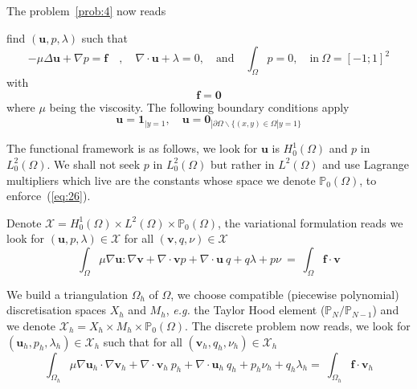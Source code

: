 The problem~\ref{prob:4} now reads
\begin{problem}
  \label{prob:5}
 find $(\mathbf{u},p,\lambda)$ such that
\begin{equation}
  \label{eq:34}
  - \mu \Delta \mathbf{u} +\nabla p = \mathbf{f}\quad, \quad \nabla \cdot \mathbf{u} + \lambda = 0, \quad \text{and}\quad \int_\Omega p = 0,\quad \text{in}\ \Omega = [-1;1]^2
\end{equation}
with
\begin{equation}
  \label{eq:35}
  \mathbf{f} = \mathbf{0}
\end{equation}
where $\mu$ being the viscosity. The following boundary conditions apply
\begin{equation}
  \label{eq:36}
  \mathbf{u}=\mathbf{1}_{|y=1}, \quad \mathbf{u}=\mathbf{0}_{|\partial \Omega \backslash \{(x,y) \in \Omega | y=1\}}
\end{equation}
\end{problem}

The functional framework is as follows, we look for $\mathbf{u}$ is
$H^1_0(\Omega)$ and $p$ in $L^2_0(\Omega)$. We shall not seek $p$ in
$L^2_0(\Omega)$ but rather in $L^2(\Omega)$ and use Lagrange
multipliers which live are the constants whose space we denote
$\mathbb{P}_0(\Omega)$, to enforce~(\ref{eq:26}).

Denote $\mathcal{X} = H^1_0(\Omega)\times
L^2(\Omega)\times\mathbb{P}_0(\Omega)$, the variational formulation
reads we look for $(\mathbf{u}, p, \lambda) \in \mathcal{X}$ for all
$(\mathbf{v},q,\nu) \in \mathcal{X}$
\begin{equation}
  \label{eq:25}
  \int_\Omega \mu \nabla \mathbf{u} : \nabla \mathbf{v} + \nabla \cdot \mathbf{v} p + \nabla \cdot \mathbf{u}\ q + q \lambda + p \nu  \ = \ \int_\Omega \mathbf{f} \cdot \mathbf{v}
\end{equation}

We build a triangulation $\Omega_h$ of $\Omega$, we choose compatible
(piecewise polynomial) discretisation spaces $X_h$ and $M_h$,
\emph{e.g.} the Taylor Hood element ($\mathbb{P}_N/\mathbb{P}_{N-1}$)
and we denote $\mathcal{X}_h=X_h\times M_h \times
\mathbb{P}_0(\Omega)$.  The discrete problem now reads, we look for
$(\mathbf{u}_h,p_h,\lambda_h) \in \mathcal{X}_h$ such that for all
$(\mathbf{v}_h,q_h,\nu_h) \in \mathcal{X}_h$
\begin{equation}
  \label{eq:27}
  \int_{\Omega_h} \mu \nabla \mathbf{u}_h \cdot \nabla \mathbf{v}_h + \nabla \cdot \mathbf{v}_h \ p_h + \nabla \cdot \mathbf{u}_h\ q_h + p_h \nu_h + q_h \lambda_h   = \ \int_{\Omega_h} \mathbf{f} \cdot \mathbf{v}_h
\end{equation}

